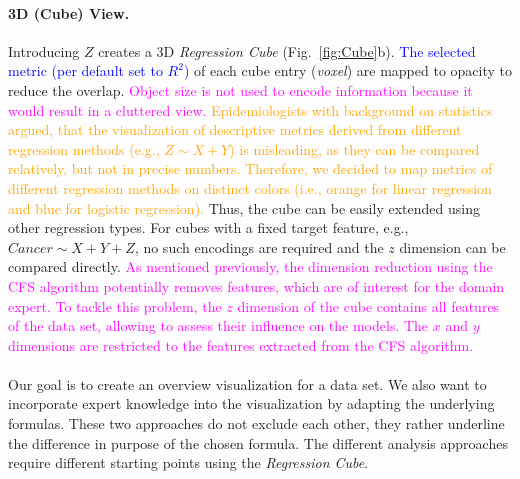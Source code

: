 \documentclass[journal]{style/vgtc} 			          %
\newcommand{\add}[1]{\textcolor{blue}{#1}}
\newcommand{\design}[1]{\textcolor{orange}{#1}}
\newcommand{\magenta}[1]{\textcolor{magenta}{#1}}
\begin{document}
\paragraph{3D (Cube) View.}
Introducing $Z$ creates a 3D \emph{Regression Cube} (Fig.~\ref{fig:Cube}b).
\add{The selected metric (per default set to $R^2$)} of each cube entry (\emph{voxel}) are mapped to opacity to reduce the overlap.
\magenta{Object size is not used to encode information because it would result in a cluttered view.}
\design{
Epidemiologists with background on statistics argued, that the visualization of descriptive metrics derived from different regression methods (e.g., $Z \sim X + Y$) is misleading, as they can be compared relatively, but not in precise numbers.
Therefore, we decided to map metrics of different regression methods on distinct colors (i.e., orange for linear regression and blue for logistic regression).
}
Thus, the cube can be easily extended using other regression types.
For cubes with a fixed target feature, e.g., $Cancer \sim X + Y + Z$, no such encodings are required and the $z$ dimension can be compared directly.
\magenta{
As mentioned previously, the dimension reduction using the CFS algorithm potentially removes features, which are of interest for the domain expert.
To tackle this problem, the $z$ dimension of the cube contains all features of the data set, allowing to assess their influence on the models.
The $x$ and $y$ dimensions are restricted to the features extracted from the CFS algorithm.
}
\\\\
Our goal is to create an overview visualization for a data set.
We also want to incorporate expert knowledge into the visualization by adapting the underlying formulas.
These two approaches do not exclude each other, they rather underline the difference in purpose of the chosen formula.
The different analysis approaches require different starting points using the \emph{Regression Cube}.
\end{document}
